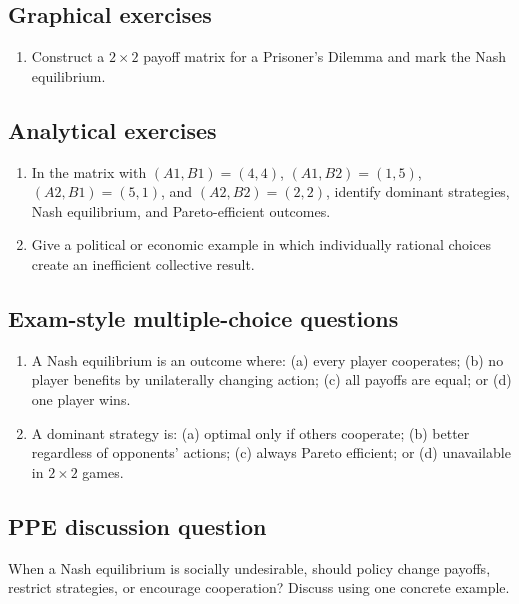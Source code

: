 \subsection*{Graphical exercises}
\begin{enumerate}[resume,label=\arabic*.]
  \item Construct a $2\times2$ payoff matrix for a Prisoner's Dilemma and mark the Nash equilibrium.
\end{enumerate}

\subsection*{Analytical exercises}
\begin{enumerate}[resume,label=\arabic*.]
  \item In the matrix with $(A1,B1)=(4,4)$, $(A1,B2)=(1,5)$, $(A2,B1)=(5,1)$, and $(A2,B2)=(2,2)$, identify dominant strategies, Nash equilibrium, and Pareto-efficient outcomes.
  \item Give a political or economic example in which individually rational choices create an inefficient collective result.
\end{enumerate}

\subsection*{Exam-style multiple-choice questions}
\begin{enumerate}[resume,label=\arabic*.]
  \item A Nash equilibrium is an outcome where: (a) every player cooperates; (b) no player benefits by unilaterally changing action; (c) all payoffs are equal; or (d) one player wins.
  \item A dominant strategy is: (a) optimal only if others cooperate; (b) better regardless of opponents' actions; (c) always Pareto efficient; or (d) unavailable in $2\times2$ games.
\end{enumerate}

\subsection*{PPE discussion question}

\noindent When a Nash equilibrium is socially undesirable, should policy change payoffs, restrict strategies, or encourage cooperation? Discuss using one concrete example.
